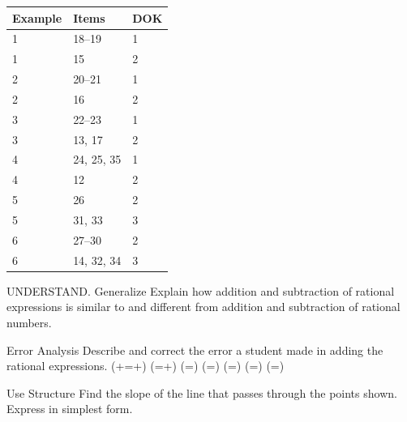 \documentclass{article}
\newenvironment{item-analysis}{}{}      %
\newenvironment{practice}[2]{}{}        %
\newcommand{\answer}[1]{}               %
\newcommand{\placeholder}[2]{}          %
\newcommand{\te}[1]{}                   %
\begin{document}
\begin{item-analysis}
\begin{tabular}{lll}
\toprule
Example & Items & DOK \\
\midrule
1 & 18--19 & 1 \\
1 & 15 & 2 \\
2 & 20--21 & 1 \\
2 & 16 & 2 \\
3 & 22--23 & 1 \\
3 & 13, 17 & 2 \\
4 & 24, 25, 35 & 1 \\
4 & 12 & 2 \\
5 & 26 & 2 \\
5 & 31, 33 & 3 \\
6 & 27--30 & 2 \\
6 & 14, 32, 34 & 3 \\
\bottomrule
\end{tabular}
\end{item-analysis}
\begin{practice}{12}{2}
UNDERSTAND. Generalize Explain how addition and subtraction of rational expressions is similar to and different from addition and subtraction of rational numbers.
\answer{The same basic procedures are followed for both. First, find a common denominator, then rewrite the expressions using the common denominator, perform the addition and/or subtraction, and then simplify.}
\end{practice}
\begin{practice}{13}{2}
Error Analysis Describe and correct the error a student made in adding the rational expressions.
(+=+)
(=+)
(=)
(=)
(=)
(=\cdot{})
(=)
\te{A red X marks the student's work as incorrect.}
\answer{When rewriting the second expression with a common denominator, the student should have had (x(x+1)(x+4)) in the numerator rather than (x(x+4)).}
\end{practice}
\begin{practice}{14}{3}
Use Structure Find the slope of the line that passes through the points shown. Express in simplest form.
\placeholder{graph}{Black x- and y-axes with arrowheads both ends, no grid, origin O. Horizontal tick labels -4,-2,2,4; vertical tick labels 4,2,-2,-2 as printed, with spacing two units and an apparent erroneous repeated bottom -2. Window approximately [-5,5] each axis. Two red points at approximate visual positions (1.3,0.7) and (-0.7,-1.3), labeled (1/a,1/b) and (-1/b,-1/a), respectively. No connecting line.}
\answer{1}
\end{practice}
\end{document}
